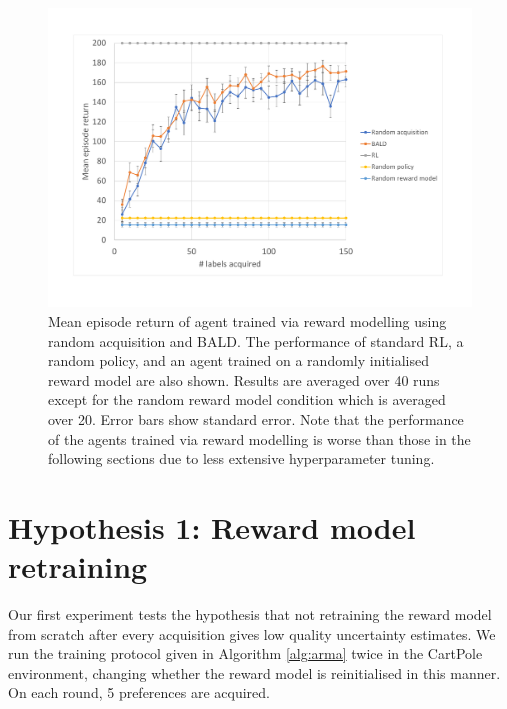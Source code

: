\documentclass[11pt, a4paper, bibliography=totoc]{report}
\begin{document}
\begin{figure}[h]
	\centering
	\includegraphics[width=\textwidth]{cartpole_curve}
	\caption{Mean episode return of agent trained via reward modelling using random acquisition and BALD. The performance of standard RL, a random policy, and an agent trained on a randomly initialised reward model are also shown. Results are averaged over 40 runs except for the random reward model condition which is averaged over 20. Error bars show standard error. Note that the performance of the agents trained via reward modelling is worse than those in the following sections due to less extensive hyperparameter tuning.}
	\label{fig:cartpole_curve}
\end{figure}

\section{Hypothesis 1: Reward model retraining}
Our first experiment tests the hypothesis that not retraining the reward model from scratch after every acquisition gives low quality uncertainty estimates. We run the training protocol given in Algorithm \ref{alg:arma} twice in the CartPole environment, changing whether the reward model is reinitialised in this manner. On each round, 5 preferences are acquired.
\end{document}
